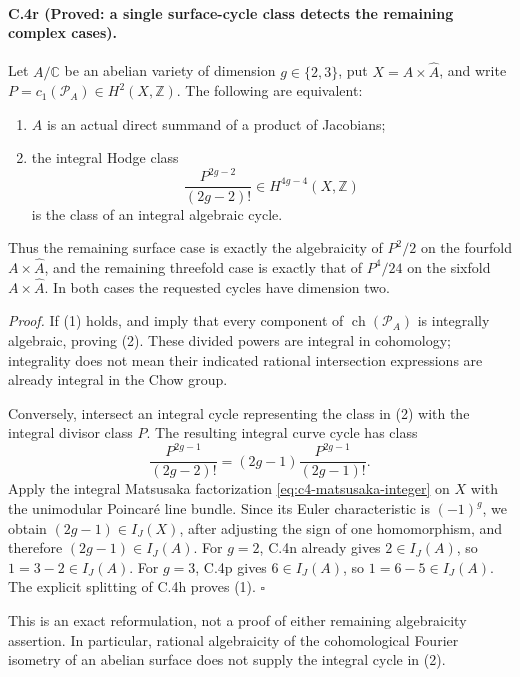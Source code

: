 \paragraph{C.4r (Proved: a single surface-cycle class detects the remaining complex cases).}
Let $A/\mathbb C$ be an abelian variety of dimension $g\in\{2,3\}$,
put $X=A\times\widehat A$, and write
$P=c_1(\mathcal P_A)\in H^2(X,\mathbb Z)$.
The following are equivalent:
\begin{enumerate}
\item $A$ is an actual direct summand of a product of Jacobians;
\item the integral Hodge class
\[
                 \frac{P^{2g-2}}{(2g-2)!}
                 \in H^{4g-4}(X,\mathbb Z)
\]
is the class of an integral algebraic cycle.
\end{enumerate}
Thus the remaining surface case is exactly the algebraicity of
$P^2/2$ on the fourfold $A\times\widehat A$, and the remaining
threefold case is exactly that of $P^4/24$ on the sixfold
$A\times\widehat A$. In both cases the requested cycles have
dimension two.

\emph{Proof.}
If (1) holds, \citet[Theorem 1.4]{cyVoisin2024} and
\citet[Theorem 1.1]{cyBeckmannFortman2023} imply that every
component of $\operatorname{ch}(\mathcal P_A)$ is integrally
algebraic, proving (2). These divided powers are integral in
cohomology; integrality does not mean their indicated rational
intersection expressions are already integral in the Chow group.

Conversely, intersect an integral cycle representing the class
in (2) with the integral divisor class $P$. The resulting integral
curve cycle has class
\[
 \frac{P^{2g-1}}{(2g-2)!}
       =(2g-1)\frac{P^{2g-1}}{(2g-1)!}.
\]
Apply the integral Matsusaka factorization
\eqref{eq:c4-matsusaka-integer} on $X$ with the unimodular
Poincar\'e line bundle. Since its Euler characteristic is
$(-1)^g$, we obtain $(2g-1)\in I_J(X)$, after adjusting the
sign of one homomorphism, and therefore $(2g-1)\in I_J(A)$.
For $g=2$, C.4n already gives $2\in I_J(A)$, so
$1=3-2\in I_J(A)$. For $g=3$, C.4p gives
$6\in I_J(A)$, so $1=6-5\in I_J(A)$.
The explicit splitting of C.4h proves (1).
\hfill$\square$

This is an exact reformulation, not a proof of either remaining
algebraicity assertion. In particular, rational algebraicity of
the cohomological Fourier isometry of an abelian surface does
not supply the integral cycle in (2).

